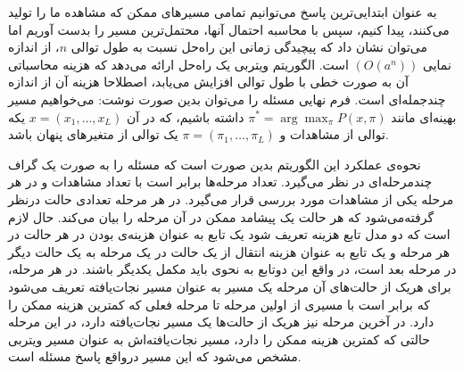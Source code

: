 به عنوان ابتدایی‌ترین پاسخ می‌توانیم تمامی مسیرهای ممکن که مشاهده ما را تولید می‌کنند، پیدا کنیم، سپس با محاسبه احتمال آنها، محتمل‌ترین مسیر را بدست آوریم اما می‌توان نشان داد که پیچیدگی زمانی این راه‌حل نسبت به طول توالی $n$، از اندازه نمایی $(O(a^n))$ است. الگوریتم ویتربی یک راه‌حل ارائه می‌دهد که هزینه محاسباتی آن به صورت خطی با طول توالی افزایش می‌یابد، اصطلاحا هزینه آن از اندازه چندجمله‌ای است. فرم نهایی مسئله را می‌توان بدین صورت نوشت: می‌خواهیم مسیر بهینه‌ای مانند $\displaystyle \pi^* = \arg \max_\pi P(x,\pi)$ داشته باشیم، که در آن $x=(x_1, \dots, x_L)$ یکه توالی از مشاهدات و $\pi = (\pi_1, \dots, \pi_L)$ یک توالی از متغیرهای پنهان باشد. 

نحوه‌ی عملکرد این الگوریتم بدین صورت است که مسئله را به صورت یک گراف چندمرحله‌ای در نظر می‌گیرد. تعداد مرحله‌ها برابر است با تعداد مشاهدات و در هر مرحله یکی از مشاهدات مورد بررسی قرار می‌گیرد. در هر مرحله تعدادی حالت درنظر گرفته‌می‌شود که هر حالت یک پیشامد ممکن در آن مرحله را بیان می‌کند. حال لازم است که دو مدل تابع هزینه تعریف شود یک تابع به عنوان هزینه‌ی بودن در هر حالت در هر مرحله و یک تابع به عنوان هزینه انتقال از یک حالت در یک مرحله به یک حالت دیگر در مرحله بعد است، در واقع این دوتابع به نحوی باید مکمل یکدیگر باشند. در هر مرحله، برای هریک از حالت‌های آن مرحله یک مسیر به عنوان مسیر نجات‌یافته تعریف می‌شود که برابر است با مسیری از اولین مرحله تا مرحله فعلی که کمترین هزینه ممکن را دارد. در آخرین مرحله نیز هریک از حالت‌ها یک مسیر نجات‌یافته دارد، در این مرحله حالتی که کمترین هزینه ممکن را دارد، مسیر نجات‌یافته‌اش به عنوان مسیر ویتربی مشخص می‌شود که این مسیر درواقع پاسخ مسئله است. 
